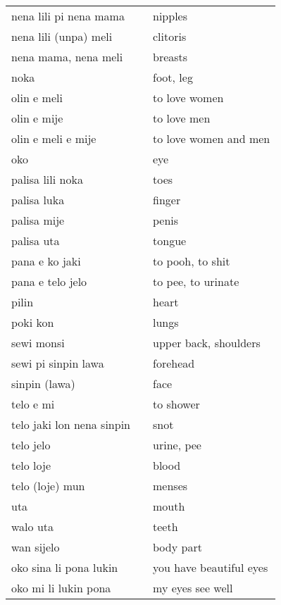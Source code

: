 \begin{supertabular}{p{4,5cm}|ll}
    nena lili pi nena mama    &  & nipples                 \\
    nena lili (unpa) meli     &  & clitoris                \\
    nena mama, nena meli      &  & breasts                 \\
    noka                      &  & foot, leg               \\
    olin e meli               &  & to love women           \\
    olin e mije               &  & to love men             \\
    olin e meli e mije        &  & to love women and men   \\
    oko                       &  & eye                     \\
    palisa lili noka          &  & toes                    \\
    palisa luka               &  & finger                  \\
    palisa mije               &  & penis                   \\
    palisa uta                &  & tongue                  \\
    pana e ko jaki            &  & to pooh, to shit        \\
    pana e telo jelo          &  & to pee, to urinate      \\
    pilin                     &  & heart                   \\
    poki kon                  &  & lungs                   \\
    sewi monsi                &  & upper back, shoulders   \\
    sewi pi sinpin lawa       &  & forehead                \\
    sinpin (lawa)             &  & face                    \\
    telo e mi                 &  & to shower               \\
    telo jaki lon nena sinpin &  & snot                    \\
    telo jelo                 &  & urine, pee              \\
    telo loje                 &  & blood                   \\
    telo (loje) mun           &  & menses                  \\
    uta                       &  & mouth                   \\
    walo uta                  &  & teeth                   \\
    wan sijelo                &  & body part               \\
    oko sina li pona lukin    &  & you have beautiful eyes \\
    oko mi li lukin pona      &  & my eyes see well        \\
\end{supertabular}

